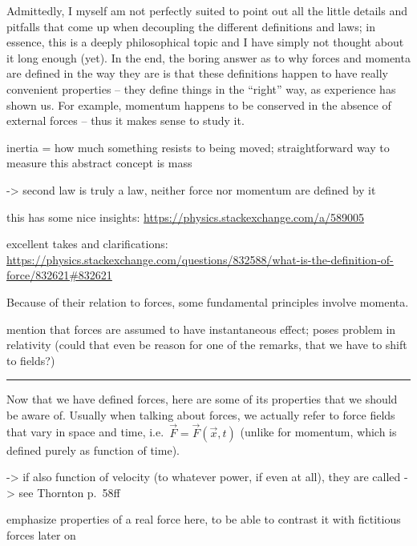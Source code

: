 \documentclass[../class_mech_main.tex]{subfiles}
\begin{document}
Admittedly, I myself am not perfectly suited to point out all the little details and pitfalls that come up when decoupling the different definitions and laws; in essence, this is a deeply philosophical topic and I have simply not thought about it long enough (yet). In the end, the boring answer as to why forces and momenta are defined in the way they are is that these definitions happen to have really convenient properties -- they define things in the \enquote{right} way, as experience has shown us. For example, momentum happens to be conserved in the absence of external forces -- thus it makes sense to study it.


inertia = how much something resists to being moved; straightforward way to measure this abstract concept is mass


-> second law is truly a law, neither force nor momentum are defined by it


this has some nice insights: \url{https://physics.stackexchange.com/a/589005}


excellent takes and clarifications: \url{https://physics.stackexchange.com/questions/832588/what-is-the-definition-of-force/832621#832621}



Because of their relation to forces, some fundamental principles involve momenta. 



mention that forces are assumed to have instantaneous effect; poses problem in relativity (could that even be reason for one of the remarks, that we have to shift to fields?)


\hrule


Now that we have defined forces, here are some of its properties that we should be aware of. Usually when talking about forces, we actually refer to force fields that vary in space and time, i.e.~$\vec{F} = \vec{F}(\vec{x}, t)$ (unlike for momentum, which is defined purely as function of time).

-> if also function of velocity (to whatever power, if even at all), they are called  -> see Thornton p.~58ff


emphasize properties of a real force here, to be able to contrast it with fictitious forces later on
\end{document}
